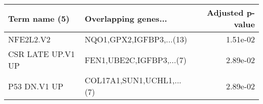 \begin{tabular}{llr}
\toprule
    Term name (5) &      Overlapping genes... &  Adjusted p-value \\
\midrule
        NFE2L2.V2 &  NQO1,GPX2,IGFBP3,...(13) &          1.51e-02 \\
CSR LATE UP.V1 UP &  FEN1,UBE2C,IGFBP3,...(7) &          2.89e-02 \\
     P53 DN.V1 UP & COL17A1,SUN1,UCHL1,...(7) &          2.89e-02 \\
\bottomrule
\end{tabular}
